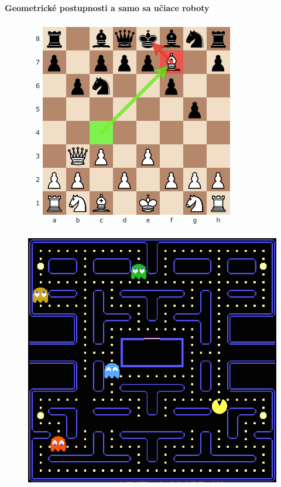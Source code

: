 \documentclass[xcolor=dvipsnames]{beamer}
\begin{document}
\begin{frame}{\bf Geometrické postupnosti a samo sa učiace roboty}

\begin{minipage}[r]{0.5\textwidth}

    \begin{figure}[htbp]
      \centering
        \includegraphics[scale=0.3]{chess.png}
    \end{figure}
    \begin{figure}[htbp]
      \centering
        \includegraphics[scale=0.1]{pacman.jpg}
    \end{figure}
\end{minipage}%
\hfill
\begin{minipage}[c]{0.5\textwidth}


\end{minipage}
\end{frame}
\end{document}
